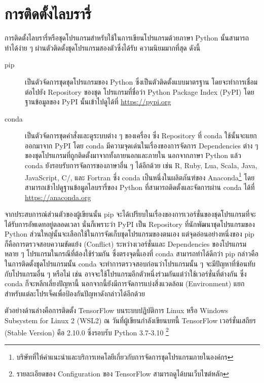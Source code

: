 \section{การติดตั้งไลบรารี่}
\label{sec:install_lib_dl}

การติดตั้งไลบรารี่หรือชุดโปรแกรมสำหรับใช้ในการเขียนโปรแกรมด้วยภาษา Python นั้นสามารถทำได้ง่าย ๆ ผ่านตัวติดตั้งชุดโปรแกรมสองตัวซึ่งได้รับ%
ความนิยมมากที่สุด ดังนี้

\begin{description}
    \item[pip] เป็นตัวจัดการชุดชุดโปรแกรมของ Python ซึ่งเป็นตัวติดตั้งแบบมาตรฐาน โดยจะทำการเชื่อมต่อไปยัง Repository ของชุด%
    โปรแกรมที่ชื่อว่า Python Package Index (PyPI) โดยฐานข้อมูลของ PyPI นั้นเข้าไปดูได้ที่ \url{https://pypi.org}
    
    \item[conda] เป็นตัวจัดการชุดคำสั่งและดูระบบต่าง ๆ ของเครื่อง ซึ่ง Repository ที่ conda ใช้นั้นจะแยกออกมาจาก PyPI โดย conda 
    มีความจุดเด่นในเรื่องของการจัดการ Dependencies ต่าง ๆ ของชุดโปรแกรมที่ถูกติดตั้งมาจากทั้งภายนอกและภายใน นอกจากภาษา Python 
    แล้ว conda ยังรอบรับการจัดการของภาษาอื่น ๆ ได้อีกด้วย เช่น R, Ruby, Lua, Scala, Java, JavaScript, C/\cpp, และ Fortran
    ซึ่ง conda เป็นหนึ่งในผลิตภันฑ์ของ Anaconda\footnote{บริษัทที่ให้คำแนะนำและบริการเทคโลยีเกี่ยวกับการจัดการชุดโปรแกรมภายในองค์กร}
    โดยสามารถเข้าไปดูฐานข้อมูลไลบรารี่ของ Python ที่สามารถติดตั้งและจัดการผ่าน conda ได้ที่ \url{https://anaconda.org}
\end{description}

จากประสบการณ์ส่วนตัวของผู้เขียนนั้น pip จะได้เปรียบในเรื่องของการเวอร์ชั่นของชุดโปรแกรมที่จะได้รับการอัพเดทอยู่ตลอดเวลา นั่นก็เพราะว่า PyPI
เป็น Repository ที่นักพัฒนาชุดโปรแกรมของ Python ส่วนใหญ่นั้นจะเลือกใช้ในการจัดเก็บชุดโปรแกรมของตนเอง แต่จุดอ่อนอย่างหนึ่งของ pip 
ก็คือการตรวจสอบความขัดแย้ง (Conflict) ระหว่างเวอร์ชั่นและ Dependencies ของโปรแกรมหลาย ๆ โปรแกรมในกรณีที่ต้องใช้ร่วมกัน 
ซึ่งตรงจุดนี้เองที่ conda สามารถทำได้ดีกว่า pip กล่าวคือ ในการติดตั้งชุดโปรแกรมนั้น conda จะทำการตรวจสอบก่อนว่าโปรแกรมนั้น ๆ 
จะมีปัญหาที่ซ้อนทับกับโปรแกรมอื่น ๆ หรือไม่ เช่น อาจจะใช้โปรแกรมอีกตัวหนึ่งร่วมกันแต่ว่าใช้เวอร์ชั่นที่ต่างกัน ซึ่ง conda ก็จะหลีกเลี่ยงปัญหานี้
นอกจากนี้ยังมีการจัดการแบ่งสิ่งแวดล้อม (Environment) แยกสำหรับแต่ละโปรเจ็คเพื่อป้องกันปัญหาดังกล่าวได้อีกด้วย

ตัวอย่างด้านล่างคือการติดตั้ง TensorFlow บนระบบปฏิบัติการ Linux หรือ Windows Subsystem for Linux 2 (WSL2)
\noindent ณ วันที่ผู้เขียนกำลังเขียนบทนี้ TensorFlow เวอร์ชั่นเสถียร (Stable Version) คือ 2.10.0 ซึ่งรอบรับ Python 3.7-3.10%
\footnote{รายละเอียดของ Configuration ของ TensorFlow สามารถดูได้บนเว็บไซต์หลัก}


